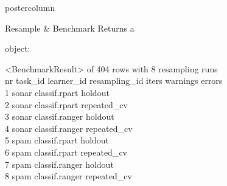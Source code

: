 \documentclass{beamer}
\newcommand{\codeinline}[1]{\begin{codeboxinline}#1\end{codeboxinline}}
\begin{document}
\begin{frame}[fragile]{}
\begin{columns}
\begin{column}{.245\textwidth}
\begin{beamercolorbox}[center]{postercolumn}
\begin{minipage}{.98\textwidth}
{\begin{myblock}{Resample \& Benchmark}
							Returns a \codeinline{} object:
							\\
							\begin{codeboxmultiline}[width=27cm]
								\scriptsize{
								<BenchmarkResult> of 404 rows with 8 resampling runs\\
								nr task\_id \space\space\space\space learner\_id resampling\_id iters warnings errors\\
								1 \space\space\space sonar \space classif.rpart 
								\space\space\space\space\space\space holdout 
								\space\space\space\space 1 
								\space\space\space\space\space\space\space 0 
								\space\space\space\space\space 0\\
								2 \space\space\space sonar \space classif.rpart 
								\space\space repeated\_cv 
								\space{}00
								\space\space\space\space\space\space{}
								\space\space\space\space{}\\
								3 \space\space\space sonar classif.ranger
								\space\space\space\space\space\space holdout
								\space\space\space\space 1
								\space\space\space\space\space\space\space 0
								\space\space\space\space\space 0\\
								4 \space\space\space sonar classif.ranger
								\space\space repeated\_cv
								\space{}
								\space\space\space\space\space\space{}
								\space\space\space\space{}\\
								5 \space\space\space\space spam  
								\space classif.rpart
								\space\space\space\space\space\space holdout
								\space\space\space{}
								\space\space\space\space\space\space{}
								\space\space\space\space{}\\
								6 \space\space\space\space spam 
								\space  classif.rpart
								\space\space repeated\_cv
								\space{}
								\space\space\space\space\space\space{}
								\space\space\space\space{}\\
								7 \space\space\space\space spam 
								classif.ranger
								\space\space\space\space\space\space holdout
								\space\space\space{}
								\space\space\space\space\space\space{} 
								\space\space\space\space{}\\
								8 \space\space\space\space spam
								classif.ranger
								\space\space repeated\_cv
								\space{}
								\space\space\space\space\space\space{}
								\space\space\space\space{}
							}
						\end{codeboxmultiline}

\end{myblock}}
\end{minipage}
\end{beamercolorbox}
\end{column}
\end{columns}
\end{frame}
\end{document}
